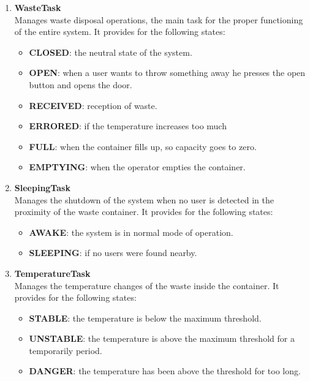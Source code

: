 \documentclass[a4paper]{article}
\begin{document}
	\begin{enumerate}
		\item \textbf{WasteTask}\\
		Manages waste disposal operations, the main task for the proper functioning of the entire system. It provides for the following states:
		\begin{itemize}
			\item \textbf{CLOSED}: the neutral state of the system.
			\item \textbf{OPEN}: when a user wants to throw something away he presses the open button and opens the door.
			\item \textbf{RECEIVED}: reception of waste.
			\item \textbf{ERRORED}: if the temperature increases too much
			\item \textbf{FULL}: when the container fills up, so capacity goes to zero.
			\item \textbf{EMPTYING}: when the operator empties the container.
		\end{itemize}
		
		\item \textbf{SleepingTask}\\
		Manages the shutdown of the system when no user is detected in the proximity of the waste container. It provides for the following states:
		\begin{itemize}
			\item \textbf{AWAKE}: the system is in normal mode of operation.
			\item \textbf{SLEEPING}: if no users were found nearby.
		\end{itemize}
		
		\item \textbf{TemperatureTask}\\
		Manages the temperature changes of the waste inside the container. It provides for the following states:
		\begin{itemize}
			\item \textbf{STABLE}: the temperature is below the maximum threshold.
			\item \textbf{UNSTABLE}: the temperature is above the maximum threshold for a temporarily period.
 			\item \textbf{DANGER}: the temperature has been above the threshold for too long.
		\end{itemize}

	\end{enumerate}
\end{document}

